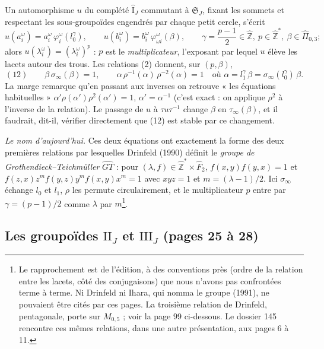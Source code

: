 \documentclass[11pt,a4paper]{article}
\begin{document}
Un automorphisme $u$ du complété $\widehat{\mathrm{I}}_J$ commutant à
$\mathfrak{S}_J$, fixant les sommets et respectant les sous-groupoïdes
engendrés par chaque petit cercle, s'écrit
\[
u(a_i^{\omega}) = a_i^{\omega}\, \varphi_i^{\omega}(l_0^{\gamma}), \qquad
u(b_i^{\omega}) = b_i^{\omega}\, \varphi^{\omega}_{\omega i}(\beta),
\qquad \gamma = \frac{p - 1}{2} \in \widehat{\mathbb{Z}},\ p \in \widehat{\mathbb{Z}}^{*},\ \beta \in \widehat\Pi_{0,3} ;
\]
alors $u(\lambda_i^{\omega}) = (\lambda_i^{\omega})^{p}$ : $p$ est le
\emph{multiplicateur}, l'exposant par lequel $u$ élève les lacets autour des
trous. Les relations (2) donnent, sur $(p, \beta)$,
\[
(12)\qquad \beta\, \sigma_\infty(\beta) = 1, \qquad
\alpha\, \rho^{-1}(\alpha)\, \rho^{-2}(\alpha) = 1 \quad \text{où } \alpha = l_1^{\gamma}\, \beta = \sigma_\infty(l_0^{\gamma})\,\beta .
\]
La marge remarque qu'en passant aux inverses on retrouve « les équations
habituelles » $\alpha'\rho(\alpha')\rho^{2}(\alpha') = 1$, $\alpha' =
\alpha^{-1}$ (c'est exact : on applique $\rho^{2}$ à l'inverse de la
relation). Le passage de $u$ à $\tau u \tau^{-1}$ change $\beta$ en
$\tau_\infty(\beta)$, et il faudrait, dit-il, vérifier directement que (12)
est stable par ce changement.

\emph{Le nom d'aujourd'hui.} Ces deux équations ont exactement la forme des
deux premières relations par lesquelles Drinfeld (1990) définit le
\emph{groupe de Grothendieck–Teichmüller} $\widehat{GT}$ : pour
$(\lambda, f) \in \widehat{\mathbb{Z}}^{*} \times \widehat{F}_2$,
$f(x, y) f(y, x) = 1$ et $f(z, x) z^{m} f(y, z) y^{m} f(x, y) x^{m} = 1$ avec
$xyz = 1$ et $m = (\lambda - 1)/2$. Ici $\sigma_\infty$ échange $l_0$ et $l_1$,
$\rho$ les permute circulairement, et le multiplicateur $p$ entre par
$\gamma = (p - 1)/2$ comme $\lambda$ par $m$\footnote{Le rapprochement est de
l'édition, à des conventions près (ordre de la relation entre les lacets,
côté des conjugaisons) que nous n'avons pas confrontées terme à terme. Ni
Drinfeld ni Ihara, qui nomma le groupe (1991), ne pouvaient être cités par ces
pages. La troisième relation de Drinfeld, pentagonale, porte sur $M_{0,5}$ ;
voir la page 99 ci-dessous. Le dossier 145 rencontre ces mêmes relations, dans
une autre présentation, aux pages 6 à 11.}.

\subsection*{Les groupoïdes $\mathrm{II}_J$ et $\mathrm{III}_J$ (pages 25 à 28)}
\end{document}

